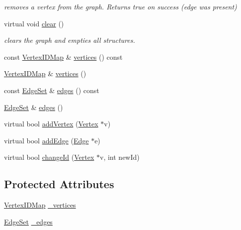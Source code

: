 \begin{DoxyCompactItemize}
\begin{DoxyCompactList}\small\item\em removes a vertex from the graph. Returns true on success (edge was present) \end{DoxyCompactList}\item 
virtual void \hyperlink{classg2o_1_1HyperGraph_a6b629dff2928dbd704ca81f24858e72f}{clear} ()
\begin{DoxyCompactList}\small\item\em clears the graph and empties all structures. \end{DoxyCompactList}\item 
const \hyperlink{classg2o_1_1HyperGraph_a97307eac064ebf4b3e2cfbf0718035b5}{Vertex\+I\+D\+Map} \& \hyperlink{classg2o_1_1HyperGraph_a3e713e7ee84eecad3876651737af6cfc}{vertices} () const 
\item 
\hyperlink{classg2o_1_1HyperGraph_a97307eac064ebf4b3e2cfbf0718035b5}{Vertex\+I\+D\+Map} \& \hyperlink{classg2o_1_1HyperGraph_a650107c875ef6f43d438d7d3e2ddf797}{vertices} ()
\item 
const \hyperlink{classg2o_1_1HyperGraph_a5e2970e236c0dcb4eff7c205d7b6b4ae}{Edge\+Set} \& \hyperlink{classg2o_1_1HyperGraph_acb3391945ed7c3f09243101d9ef0aaf0}{edges} () const 
\item 
\hyperlink{classg2o_1_1HyperGraph_a5e2970e236c0dcb4eff7c205d7b6b4ae}{Edge\+Set} \& \hyperlink{classg2o_1_1HyperGraph_a2f9f023fe2fb491ef9af873b9e683006}{edges} ()
\item 
virtual bool \hyperlink{classg2o_1_1HyperGraph_a7ef87ba3479827b24c6fc29c5fc3aa21}{add\+Vertex} (\hyperlink{classg2o_1_1HyperGraph_1_1Vertex}{Vertex} $\ast$v)
\item 
virtual bool \hyperlink{classg2o_1_1HyperGraph_a0f1d35009a2879b238c8148c33485c89}{add\+Edge} (\hyperlink{classg2o_1_1HyperGraph_1_1Edge}{Edge} $\ast$e)
\item 
virtual bool \hyperlink{classg2o_1_1HyperGraph_a74f0d7392e67762a85799db72a58a94c}{change\+Id} (\hyperlink{classg2o_1_1HyperGraph_1_1Vertex}{Vertex} $\ast$v, int new\+Id)
\end{DoxyCompactItemize}
\subsection*{Protected Attributes}
\begin{DoxyCompactItemize}
\item 
\hyperlink{classg2o_1_1HyperGraph_a97307eac064ebf4b3e2cfbf0718035b5}{Vertex\+I\+D\+Map} \hyperlink{classg2o_1_1HyperGraph_a83132c77c8d0896581d168cbc72f673a}{\+\_\+vertices}
\item 
\hyperlink{classg2o_1_1HyperGraph_a5e2970e236c0dcb4eff7c205d7b6b4ae}{Edge\+Set} \hyperlink{classg2o_1_1HyperGraph_afe4ae6e9ef05c8bded2b1b30e1886b36}{\+\_\+edges}
\end{DoxyCompactItemize}
